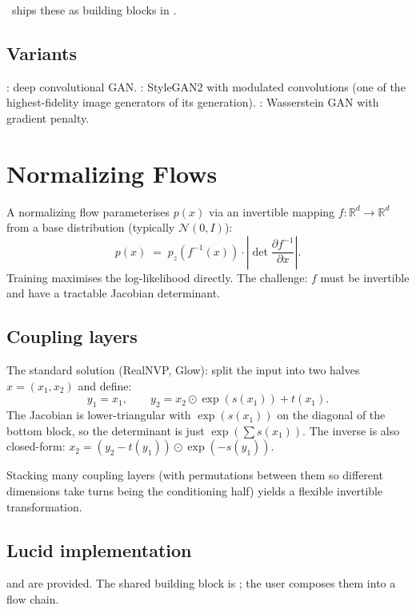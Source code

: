 \Lucid\ ships these as building blocks in
.

\subsection{Variants}
\label{ssec:generative:gan_variants}

: deep convolutional GAN.
: StyleGAN2 \cite{karras_stylegan_2019} with
modulated convolutions (one of the highest-fidelity image
generators of its generation).
: Wasserstein GAN with gradient penalty.

\section{Normalizing Flows}
\label{sec:generative:flows}

A normalizing flow \cite{rezende_nf_2015} parameterises $p(x)$
via an invertible mapping $f: \mathbb{R}^d \to \mathbb{R}^d$ from
a base distribution (typically $\mathcal{N}(0, I)$):
\[
  p(x) \;=\; p_z(f^{-1}(x)) \cdot \left| \det \frac{\partial f^{-1}}{\partial x} \right|.
\]
Training maximises the log-likelihood directly. The challenge:
$f$ must be invertible and have a tractable Jacobian
determinant.

\subsection{Coupling layers}
\label{ssec:generative:coupling}

The standard solution (RealNVP, Glow): split the input into two
halves $x = (x_1, x_2)$ and define:
\[
  y_1 = x_1, \qquad
  y_2 = x_2 \odot \exp(s(x_1)) + t(x_1).
\]
The Jacobian is lower-triangular with $\exp(s(x_1))$ on the
diagonal of the bottom block, so the determinant is just
$\exp(\sum s(x_1))$. The inverse is also closed-form:
$x_2 = (y_2 - t(y_1)) \odot \exp(-s(y_1))$.

Stacking many coupling layers (with permutations between them
so different dimensions take turns being the conditioning half)
yields a flexible invertible transformation.

\subsection{Lucid implementation}
\label{ssec:generative:flows_impl}

 and
 are provided. The shared building
block is ; the user composes them into a
flow chain.

